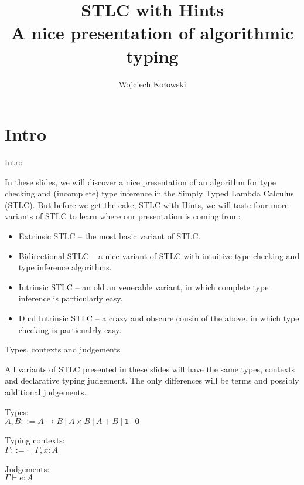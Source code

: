 \documentclass{beamer}
\title{STLC with Hints\\A nice presentation of algorithmic typing}
\author{Wojciech Kołowski}
\newcommand{\pipe}{\ |\ }
\newcommand{\Fun}[2]{#1 \to #2}
\newcommand{\Prod}[2]{#1 \times #2}
\newcommand{\Sum}[2]{#1 + #2}
\newcommand{\Unit}{\textbf{1}}
\newcommand{\Empty}{\textbf{0}}
\newcommand{\fulltyping}[3]{#1 \vdash #2 : #3}
\newcommand{\emptytypingctx}{\cdot}
\newcommand{\extend}[3]{#1, #2 : #3}
\begin{document}
\frame{\titlepage}

\section{Intro}

\begin{frame}{Intro}

In these slides, we will discover a nice presentation of an algorithm for type checking and (incomplete) type inference in the Simply Typed Lambda Calculus (STLC). But before we get the cake, STLC with Hints, we will taste four more variants of STLC to learn where our presentation is coming from:

\begin{itemize}
  \item Extrinsic STLC -- the most basic variant of STLC.
  \item Bidirectional STLC -- a nice variant of STLC with intuitive type checking and type inference algorithms.
  \item Intrinsic STLC -- an old an venerable variant, in which complete type inference is particularly easy.
  \item Dual Intrinsic STLC -- a crazy and obscure cousin of the above, in which type checking is particualrly easy.
\end{itemize}

\end{frame}

\begin{frame}{Types, contexts and judgements}

All variants of STLC presented in these slides will have the same types, contexts and declarative typing judgement. The only differences will be terms and possibly additional judgements.

\vspace{2em}

Types: \\
$A, B ::= \Fun{A}{B} \pipe \Prod{A}{B} \pipe \Sum{A}{B} \pipe \Unit \pipe \Empty$

\vspace{2em}

Typing contexts: \\
$\Gamma ::= \emptytypingctx \pipe \extend{\Gamma}{x}{A}$

\vspace{2em}

Judgements: \\
$\fulltyping{\Gamma}{e}{A}$

\end{frame}
\end{document}
